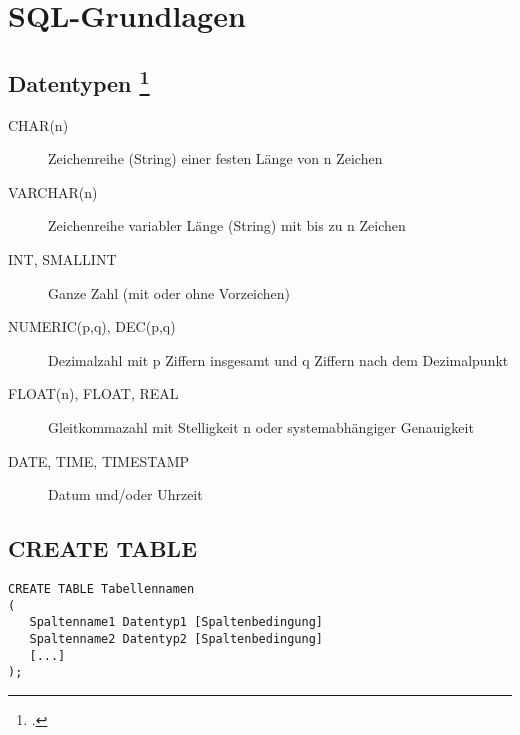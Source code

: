 \documentclass{lehramt-informatik}
\begin{document}

\chapter{SQL-Grundlagen}

%

\section{Datentypen
\footcite[Seite 132]{winter}}

\begin{description}
\item[CHAR(n)] Zeichenreihe (String) einer festen Länge von n Zeichen

\item[VARCHAR(n)] Zeichenreihe variabler Länge (String) mit bis zu n
Zeichen

\item[INT, SMALLINT] Ganze Zahl (mit oder ohne Vorzeichen)

\item[NUMERIC(p,q), DEC(p,q)] Dezimalzahl mit p Ziffern insgesamt und q
Ziffern nach dem Dezimalpunkt

\item[FLOAT(n), FLOAT, REAL] Gleitkommazahl mit Stelligkeit n oder
systemabhängiger Genauigkeit

\item[DATE, TIME, TIMESTAMP] Datum und/oder Uhrzeit
\end{description}

\section{CREATE TABLE}

\begin{verbatim}
CREATE TABLE Tabellennamen
(
   Spaltenname1 Datentyp1 [Spaltenbedingung]
   Spaltenname2 Datentyp2 [Spaltenbedingung]
   [...]
);
\end{verbatim}

%
\end{document}
